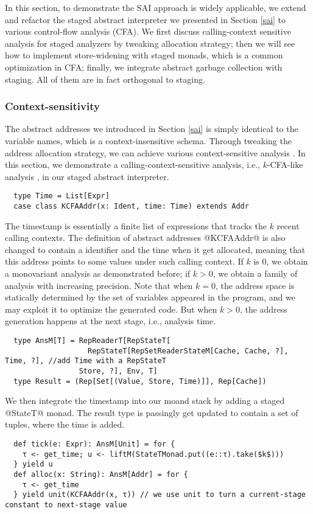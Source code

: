 In this section, to demonstrate the SAI approach is widely applicable, we extend
and refactor the staged abstract interpreter we presented in Section \ref{sai}
to various control-flow analysis (CFA). We first discuss calling-context
sensitive analysis for staged analyzers by tweaking allocation strategy; then we
will see how to implement store-widening with staged monads, which is a common
optimization in CFA; finally, we integrate abstract garbage collection with
staging. All of them are in fact orthogonal to staging.

\subsubsection{Context-sensitivity}

The abstract addresses we introduced in Section \ref{sai} is simply identical to
the variable names, which is a context-insensitive schema.
Through tweaking the address allocation strategy, we can achieve various
context-sensitive analysis \cite{DBLP:conf/icfp/Gilray0M16}. In this section, we
demonstrate a calling-context-sensitive analysis, i.e., $k$-CFA-like analysis
\cite{DBLP:journals/jfp/HornM12}, in our staged abstract interpreter.
\begin{lstlisting}
  type Time = List[Expr]
  case class KCFAAddr(x: Ident, time: Time) extends Addr
\end{lstlisting}

The timestamp is essentially a finite list of expressions that tracks the $k$
recent calling contexts. The definition of abstract addresses @KCFAAddr@ is also
changed to contain a identifier and the time when it get allocated, meaning that
this address points to some values under such calling context. If $k$ is 0, we
obtain a monovariant analysis as demonstrated before; if $k > 0$, we obtain a
family of analysis with increasing precision. Note that when $k = 0$, the
address space is statically determined by the set of variables appeared in the
program, and we may exploit it to optimize the generated code. But when $k > 0$,
the address generation happens at the next stage, i.e., analysis time.
\begin{lstlisting}
  type AnsM[T] = RepReaderT[RepStateT[
                   RepStateT[RepSetReaderStateM[Cache, Cache, ?], Time, ?], //add Time with a RepStateT
                 Store, ?], Env, T]
  type Result = (Rep[Set[(Value, Store, Time)]], Rep[Cache])
\end{lstlisting}

We then integrate the timestamp into our moand stack by adding a staged
@StateT@ monad. The result type is passingly get updated to contain a set of
tuples, where the time is added.
\begin{lstlisting}
  def tick(e: Expr): AnsM[Unit] = for {
    τ <- get_time; u <- liftM(StateTMonad.put((e::τ).take($k$)))
  } yield u
  def alloc(x: String): AnsM[Addr] = for {
    τ <- get_time
  } yield unit(KCFAAddr(x, τ)) // we use unit to turn a current-stage constant to next-stage value
\end{lstlisting}

